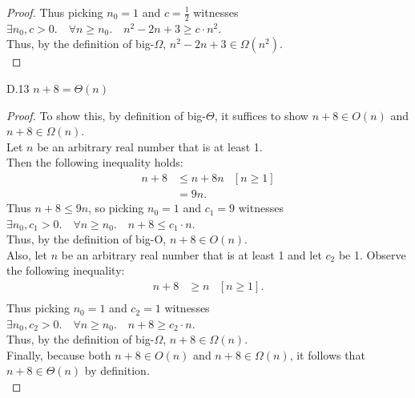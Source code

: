 \documentclass[10pt]{article}
\begin{document}
\begin{enumerate}[label={}]
\begin{proof}
              Thus picking $n_0=1$ and $c=\frac{1}{2}$ witnesses \\$\exists n_0, c>0 .\quad \forall n \geq n_0 .\quad n^2-2 n+3 \geq c \cdot n^2$.\\
                  Thus, by the definition of big-$\Omega$, $n^2-2 n+3 \in \Omega\left(n^2\right)$.\\
          \end{proof}
          \newpage

          D.13 $n+8=\Theta(n)$
          \begin{proof}
              To show this, by definition of big-$\Theta$, it suffices to show $n+8 \in O\left(n\right)$ and $n+8 \in \Omega\left(n\right)$.\\
              Let $n$ be an arbitrary real number that is at least 1.\\
              Then the following inequality holds:
              $$
                  \begin{aligned}
                      n+8 & \leq n+8n
                          & {\left[n \geq 1\right] } \\
                          & = 9n .
                  \end{aligned}
              $$
              Thus $n+8 \leq 9n$, so picking $n_0=1$ and $c_1=9$ witnesses \\$\exists n_0, c_1>0 .\quad \forall n \geq n_0 .\quad n+8 \leq c_1 \cdot n$.\\
                  Thus, by the definition of big-O, $n+8 \in O\left(n\right)$.\\
                  Also, let $n$ be an arbitrary real number that is at least 1 and let $c_2$ be 1. Observe the following inequality:
                  $$
                      \begin{aligned}
                          n+8 & \geq n
                              & {\left[n \geq 1\right] }. \\
                      \end{aligned}
                  $$
                  Thus picking $n_0=1$ and $c_2=1$ witnesses \\$\exists n_0, c_2>0 .\quad \forall n \geq n_0 .\quad n+8 \geq c_2 \cdot n$.\\
                  Thus, by the definition of big-$\Omega$, $n+8 \in \Omega\left(n\right)$.\\
                  Finally, because both $n+8 \in O\left(n\right)$ and $n+8 \in \Omega\left(n\right)$, it follows that $n+8\in\Theta(n)$ by definition.\\
          \end{proof}


\end{enumerate}
\end{document}
